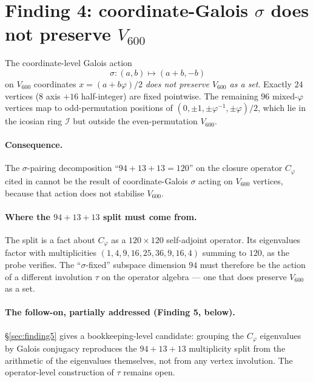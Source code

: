 \documentclass[11pt,a4paper]{article}
\newcommand{\II}{\mathcal{I}}
\newcommand{\Vsix}{V_{600}}
\newcommand{\Cphi}{C_\varphi}
\begin{document}
\section{Finding 4: coordinate-Galois $\sigma$ does not preserve
$V_{600}$}
\label{sec:finding4}

\begin{findingbox}[title=Finding 4]
The coordinate-level Galois action
\[
\sigma : (a, b) \mapsto (a + b, -b)
\]
on $\Vsix$ coordinates $x = (a + b\varphi)/2$ \emph{does not
preserve $\Vsix$ as a set}. Exactly $24$ vertices ($8$ axis $+
16$ half-integer) are fixed pointwise. The remaining $96$
mixed-$\varphi$ vertices map to odd-permutation positions of
$(0, \pm 1, \pm \varphi^{-1}, \pm \varphi)/2$, which lie in the
icosian ring $\II$ but outside the even-permutation
$\Vsix$.
\end{findingbox}

\paragraph{Consequence.} The $\sigma$-pairing decomposition
``$94 + 13 + 13 = 120$'' on the closure operator $\Cphi$ cited in
\cite[Theorem on $\Cphi$ $\sigma$-pairing]{icosianTriad} cannot be
the result of coordinate-Galois $\sigma$ acting on $\Vsix$
vertices, because that action does not stabilise $\Vsix$.

\paragraph{Where the $94 + 13 + 13$ split must come from.} The
split is a fact about $\Cphi$ as a $120 \times 120$ self-adjoint
operator. Its eigenvalues factor with multiplicities $(1, 4, 9,
16, 25, 36, 9, 16, 4)$ summing to $120$, as the probe verifies.
The ``$\sigma$-fixed'' subspace dimension $94$ must therefore be
the action of a different involution $\tau$ on the operator
algebra --- one that does preserve $\Vsix$ as a set.

\paragraph{The follow-on, partially addressed (Finding 5, below).}
\S\ref{sec:finding5} gives a bookkeeping-level candidate: grouping
the $\Cphi$ eigenvalues by Galois conjugacy reproduces the
$94 + 13 + 13$ multiplicity split from the arithmetic of the
eigenvalues themselves, not from any vertex involution. The
operator-level construction of $\tau$ remains open.
\end{document}
